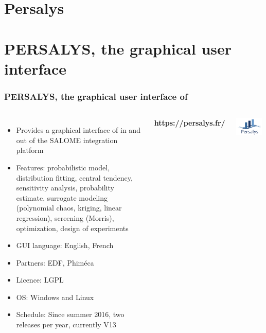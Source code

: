 \documentclass[aspectratio=169]{beamer}
\begin{document}
\section{Persalys}



\section{PERSALYS, the graphical user interface}

\begin{frame}
\frametitle{PERSALYS, the graphical user interface of \ot{}}
	
\begin{columns}
	
\begin{itemize}
\item Provides a graphical interface of 
\ot{} in and out of the SALOME integration platform
\item Features: probabilistic model, 
	distribution fitting, central tendency, 
  sensitivity analysis, probability estimate, 
	surrogate modeling (polynomial chaos, kriging, linear regression), screening (Morris), 
	optimization, design of experiments
\item GUI language: English, French

\item Partners: EDF, Phim\'eca
\item Licence: LGPL
\item OS: Windows and Linux

\item Schedule: Since summer 2016, two releases per year, currently V13

\end{itemize}


\textbf{https://persalys.fr/}

\begin{center}
\includegraphics[width=0.95\textwidth]{figures/PERSALYS-LOGO.png}
\end{center}

\end{columns}


\end{frame}
\end{document}
